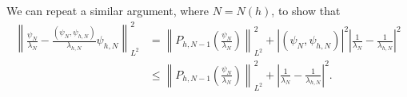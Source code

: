 
We can repeat a similar argument, where \(N = N(h)\), to show that
\begin{align*}
    \left\lVert \frac{\psi_N}{\lambda_N} - \frac{(\psi_N, \psi_{h, N})}{\lambda_{h, N}} \psi_{h, N} \right\rVert_{L^2}^2
    & = \left\lVert P_{h, N-1}\left( \frac{\psi_N}{\lambda_N} \right)\right\rVert_{L^2}^2
    +  \left\lvert (\psi_N, \psi_{h, N}) \right\rvert^2 \left\lvert \frac{1}{\lambda_N} - \frac{1}{\lambda_{h, N}} \right\rvert^2 \\
    & \leq \left\lVert P_{h, N-1}\left( \frac{\psi_N}{\lambda_N} \right)\right\rVert_{L^2}^2
    +  \left\lvert \frac{1}{\lambda_N} - \frac{1}{\lambda_{h, N}} \right\rvert^2.
\end{align*}
